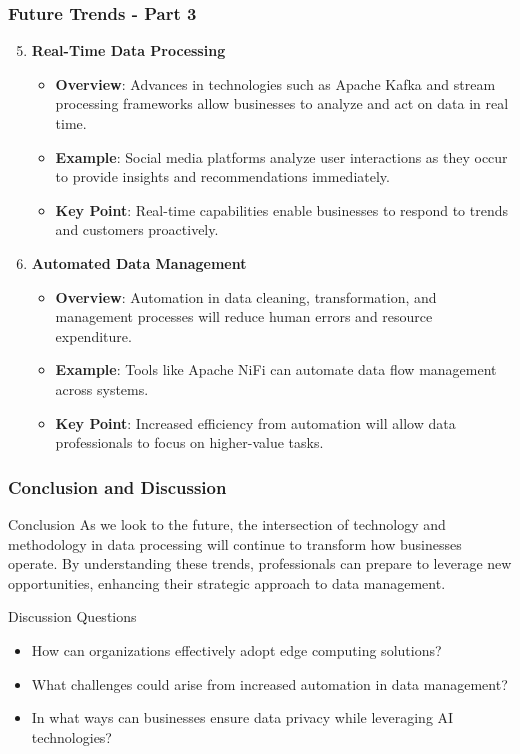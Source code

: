 \documentclass{beamer}
\begin{document}
\begin{frame}[fragile]
    \frametitle{Future Trends - Part 3}
    
    \begin{enumerate}
        \setcounter{enumi}{4}
        \item \textbf{Real-Time Data Processing}
            \begin{itemize}
                \item \textbf{Overview}: Advances in technologies such as Apache Kafka and stream processing frameworks allow businesses to analyze and act on data in real time.
                \item \textbf{Example}: Social media platforms analyze user interactions as they occur to provide insights and recommendations immediately.
                \item \textbf{Key Point}: Real-time capabilities enable businesses to respond to trends and customers proactively.
            \end{itemize}
        
        \item \textbf{Automated Data Management}
            \begin{itemize}
                \item \textbf{Overview}: Automation in data cleaning, transformation, and management processes will reduce human errors and resource expenditure.
                \item \textbf{Example}: Tools like Apache NiFi can automate data flow management across systems.
                \item \textbf{Key Point}: Increased efficiency from automation will allow data professionals to focus on higher-value tasks.
            \end{itemize}
    \end{enumerate}
\end{frame}

\begin{frame}[fragile]
    \frametitle{Conclusion and Discussion}
    
    \begin{block}{Conclusion}
        As we look to the future, the intersection of technology and methodology in data processing will continue to transform how businesses operate. By understanding these trends, professionals can prepare to leverage new opportunities, enhancing their strategic approach to data management.
    \end{block}
    
    \begin{block}{Discussion Questions}
        \begin{itemize}
            \item How can organizations effectively adopt edge computing solutions?
            \item What challenges could arise from increased automation in data management?
            \item In what ways can businesses ensure data privacy while leveraging AI technologies?
        \end{itemize}
    \end{block}
\end{frame}
\end{document}
